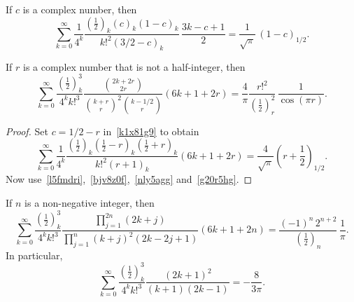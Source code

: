 \documentclass[12pt,reqno]{article}
\begin{document}
\begin{lemma}\label{nnoqyfq}
If $c$ is a complex number, then
\begin{equation}\label{k1x81g9}
\sum_{k = 0}^\infty  {\frac{1}{{4^k }}\frac{{\left( {\frac{1}{2}} \right)_k \left( c \right)_k \left( {1 - c} \right)_k }}{{k!^2 \left( {3/2 - c} \right)_k }}\,\frac{{3k - c + 1}}{2}}  = \frac{1}{{\sqrt \pi  }}\,(1-c)_{1/2}.
\end{equation}
\end{lemma}
\begin{theorem}
If $r$ is a complex number that is not a half-integer, then
\begin{equation}
\sum_{k = 0}^\infty  {\frac{{\left( {\frac{1}{2}} \right)_k^3 }}{{4^k k!^3 }}\frac{{\binom{{2k + 2r}}{{2r}}}}{{\binom{{k + r}}{r}^2 \binom{{k - 1/2}}{r}}}\left( {6k + 1 + 2r} \right)}  = \frac{4}{\pi }\frac{{r!^2 }}{{\left( {\frac{1}{2}} \right)_r^2 }}\,\frac{{1 }}{{\cos\left( {\pi r} \right)}}.
\end{equation}
\end{theorem}
\begin{proof}
Set $c=1/2-r$ in~\eqref{k1x81g9} to obtain
\begin{equation}\label{w4w5kv4}
\sum_{k = 0}^\infty  {\frac{1}{{4^k }}\frac{{\left( {\frac{1}{2}} \right)_k \left( {\frac{1}{2} - r} \right)_k \left( {\frac{1}{2} + r} \right)_k }}{{k!^2 \left( {r + 1} \right)_k }}\left( {6k + 1 + 2r} \right)}  = \frac{4}{{\sqrt \pi  }}\left( {r + \frac{1}{2}} \right)_{1/2} .
\end{equation}
Now use~\eqref{l5fmdri},~\eqref{bjv8z0f},~\eqref{nly5agg} and~\eqref{g20r5hg}.
\end{proof}
\begin{corollary}
If $n$ is a non-negative integer, then
\begin{equation*}
\sum_{k = 0}^\infty  {\frac{{\left( {\frac{1}{2}} \right)_k^3 }}{{4^k k!^3 }}\frac{{\prod_{j = 1}^{2n} {\left( {2k + j} \right)} }}{{\prod_{j = 1}^n {\left( {k + j} \right)^2 \left( {2k - 2j + 1} \right)} }}\left( {6k + 1 + 2n} \right)}  = \frac{{( - 1)^n\,2^{n+2} }}{{\left( {\frac{1}{2}} \right)_n }}\, \frac1{\pi }.
\end{equation*}
In particular,
\begin{equation}
\sum_{k = 0}^\infty  {\frac{{\left( {\frac{1}{2}} \right)_k^3 }}{{4^k k!^3 }}\frac{{\left( {2k + 1} \right)^2 }}{{\left( {k + 1} \right)\left( {2k - 1} \right)}}}  =  - \frac{8}{{3\pi }}.
\end{equation}
\end{corollary}
\end{document}
